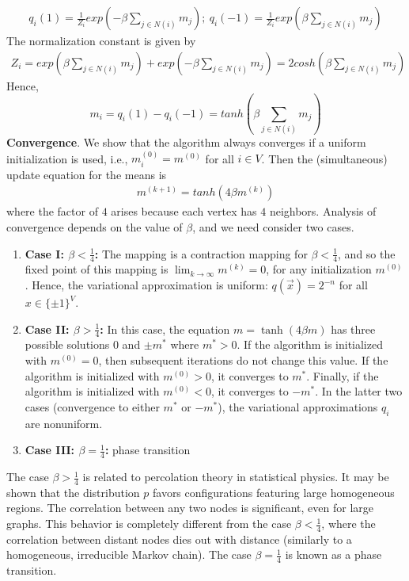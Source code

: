 \documentclass[11pt]{elegantbook}
\begin{document}
\begin{equation}
    \begin{aligned}
        q_i(1)=\frac{1}{Z_i}exp\left(-\beta\sum_{j\in N(i)} m_j\right);\ q_i(-1)=\frac{1}{Z_i}exp\left(\beta\sum_{j\in N(i)} m_j\right)
    \end{aligned}
    \nonumber
\end{equation}
The normalization constant is given by
\begin{equation}
    \begin{aligned}
        Z_i=exp\left(\beta\sum_{j\in N(i)} m_j\right)+exp\left(-\beta\sum_{j\in N(i)} m_j\right)=2{cosh}\left(\beta\sum_{j\in N(i)}m_j\right)
    \end{aligned}
    \nonumber
\end{equation}
Hence, $$m_i=q_i(1)-q_i(-1)={tanh}\left(\beta\sum_{j\in N(i)}m_j\right)$$
\textbf{Convergence}. We show that the algorithm always converges if a uniform initialization is used, i.e., $m_i^{(0)} = m^{(0)}$ for all $i \in V$. Then the (simultaneous) update equation for the means is
\begin{equation}
    \begin{aligned}
        m^{(k+1)}={tanh}\left(4\beta m^{(k)}\right)
    \end{aligned}
    \nonumber
\end{equation}
where the factor of $4$ arises because each vertex has $4$ neighbors. Analysis of convergence depends on the value of $\beta$, and we need consider two cases.
\begin{enumerate}[(1)]
    \item \textbf{Case I: $\beta < \frac{1}{4}$:} The mapping is a contraction mapping for $\beta<\frac{1}{4}$, and so the fixed point of this mapping is $\lim_{k \rightarrow \infty} m^{(k)} = 0$, for any initialization $m^{(0)}$. Hence, the variational approximation is uniform: $q(\vec{x}) = 2^{-n}$ for all $x \in \{\pm 1\}^V$.
    \item \textbf{Case II: $\beta > \frac{1}{4}$:} In this case, the equation $m=\tanh (4 \beta m)$ has three possible solutions 0 and $\pm m^*$ where $m^*>0$. If the algorithm is initialized with $m^{(0)}=0$, then subsequent iterations do not change this value. If the algorithm is initialized with $m^{(0)}>0$, it converges to $m^*$. Finally, if the algorithm is initialized with $m^{(0)}<0$, it converges to $-m^*$. In the latter two cases (convergence to either $m^*$ or $-m^*$), the variational approximations $q_i$ are nonuniform.
    \item \textbf{Case III: $\beta = \frac{1}{4}$:} phase transition
\end{enumerate}
The case $\beta>\frac{1}{4}$ is related to percolation theory in statistical physics. It may be shown that the distribution $p$ favors configurations featuring large homogeneous regions. The correlation between any two nodes is significant, even for large graphs. This behavior is completely different from the case $\beta<\frac{1}{4}$, where the correlation between distant nodes dies out with distance (similarly to a homogeneous, irreducible Markov chain). The case $\beta=\frac{1}{4}$ is known as a phase transition.
\end{document}
